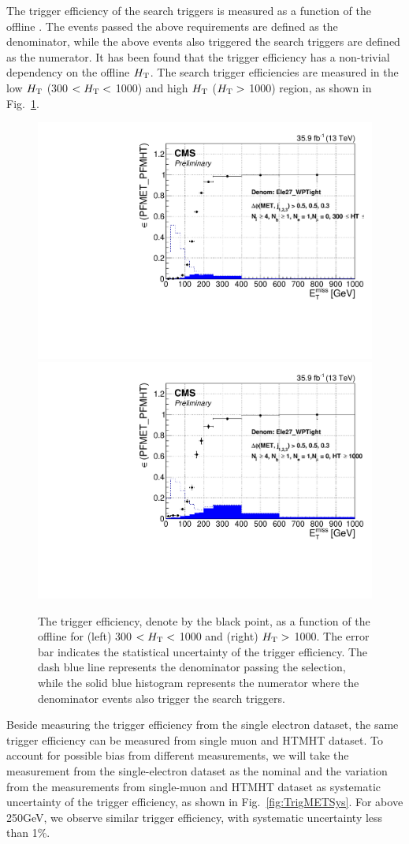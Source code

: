 The trigger efficiency of the search triggers is measured as a function of the offline \MET.  The events passed the above requirements are defined as the
denominator, while the above events also triggered the search triggers are defined as the numerator. It has been found that the \MET trigger efficiency has a non-trivial dependency on the offline $H_{\mathrm{T}}$. The search trigger efficiencies are measured in the low $H_{\mathrm{T}}$ (300 $< H_{\mathrm{T}} <$ 1000) and high
$H_{\mathrm{T}}$ ($H_{\mathrm{T}} >$ 1000) region, as shown in Fig.~\ref{fig:TrigMET}.
\begin{figure}[tbp]
 \begin{center}
   \includegraphics[width=0.49\linewidth]{sections/mc4/EvtSelSBOpt/figures/TrigEle_Stop_TrigMET_HTLess1000_9.pdf}
   \includegraphics[width=0.49\linewidth]{sections/mc4/EvtSelSBOpt/figures/TrigEle_Stop_TrigMET_HTMore1000_9.pdf}
   \caption{ The trigger efficiency, denote by the black point, as a function
   of the offline \MET for (left) 300 $< H_{\mathrm{T}} <$ 1000 and (right) $H_{\mathrm{T}} >$ 1000.
   The error bar indicates the statistical uncertainty of the trigger
   efficiency. The dash blue line represents the denominator passing the
   selection, while the solid blue histogram represents the numerator where
   the denominator events also trigger the search triggers. }
   \label{fig:TrigMET}
 \end{center}
\end{figure}

Beside measuring the \MET trigger efficiency from the single electron dataset, the same trigger efficiency can be measured from single muon and HTMHT
dataset. To account for possible bias from different measurements, we will take the measurement from the single-electron dataset as the nominal and the
variation from the measurements from single-muon and HTMHT dataset as
systematic uncertainty of the trigger efficiency, as shown in
Fig.~\ref{fig:TrigMETSys}. For \MET above 250GeV, we observe similar \MET
trigger efficiency, with systematic uncertainty less than 1\%.

